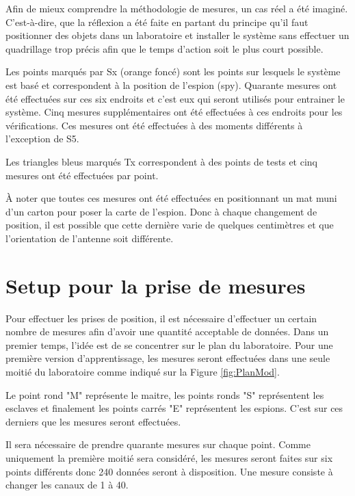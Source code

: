 Afin de mieux comprendre la méthodologie de mesures, un cas réel a été imaginé. C'est-à-dire, que la réflexion a été faite en partant du principe qu'il faut positionner des objets dans un laboratoire et installer le système sans effectuer un quadrillage trop précis afin que le temps d'action soit le plus court possible. 

Les points marqués par Sx (orange foncé) sont les points sur lesquels le système est basé et correspondent à la position de l'espion (spy). Quarante mesures ont été effectuées sur ces six endroits et c'est eux qui seront utilisés pour entrainer le système. Cinq mesures supplémentaires ont été effectuées à ces endroits pour les vérifications. Ces mesures ont été effectuées à des moments différents à l'exception de S5.

Les triangles bleus marqués Tx correspondent à des points de tests et cinq mesures ont été effectuées par point. 

À noter que toutes ces mesures ont été effectuées en positionnant un mat muni d'un carton pour poser la carte de l'espion. Donc à chaque changement de position, il est possible que cette dernière varie de quelques centimètres et que l'orientation de l'antenne soit différente. 

\section{Setup pour la prise de mesures}
Pour effectuer les prises de position, il est nécessaire d'effectuer un certain nombre de mesures afin d'avoir une quantité acceptable de données. Dans un premier temps, l'idée est de se concentrer sur le plan du laboratoire. Pour une première version d'apprentissage, les mesures seront effectuées dans une seule moitié du laboratoire comme indiqué sur la Figure \ref{fig:PlanMod}.

Le point rond "M" représente le maitre, les points ronds "S" représentent les esclaves et finalement les points carrés "E" représentent les espions. C'est sur ces derniers que les mesures seront effectuées. 

Il sera nécessaire de prendre quarante mesures sur chaque point. Comme uniquement la première moitié sera considéré, les mesures seront faites sur six points différents donc 240 données seront à disposition. Une mesure consiste à changer les canaux de 1 à 40.

